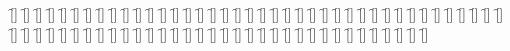 \begin{questions}
\begin{multicols}{2}
        \question  \f[]
        \question  \f[]
        \question  \f[]
        \question  \f[]
        \question  \f[]
        \question  \f[]
        \question  \f[]
        \question  \f[]
        \question  \f[]
        \question  \f[]
        \question  \f[]
        \question  \f[]
        \question  \f[]
        \question  \f[]
        \question  \f[]
        \question  \f[]
        \question  \f[]
        \question  \f[]
        \question  \f[]
        \question  \f[]
        \question  \f[]
        \question  \f[]
        \question  \f[]
        \question  \f[]
        \question  \f[]
        \question  \f[]
        \question  \f[]
        \question  \f[]
        \question  \f[]
        \question  \f[]
        \question  \f[]
        \question  \f[]
        \question  \f[]
        \question  \f[]
        \question  \f[]
        \question  \f[]
        \question  \f[]
        \question  \f[]
        \question  \f[]
        \question  \f[]
        \question  \f[]
        \question  \f[]
        \question  \f[]
        \question  \f[]
        \question  \f[]
        \question  \f[]
        \question  \f[]
        \question  \f[]
        \question  \f[]
        \question  \f[]
        \question  \f[]
        \question  \f[]
        \question  \f[]
        \question  \f[]
        \question  \f[]
        \question  \f[]
        \question  \f[]
        \question  \f[]
        \question  \f[]
        \question  \f[]
        \question  \f[]
        \question  \f[]
        \question  \f[]
        \question  \f[]
        \question  \f[]
        \question  \f[]
        \question  \f[]
        \question  \f[]
        \question  \f[]
        \question  \f[]
        \question  \f[]
        \question  \f[]
        \question  \f[]
        \question  \f[]
    \end{multicols}
\end{questions}
